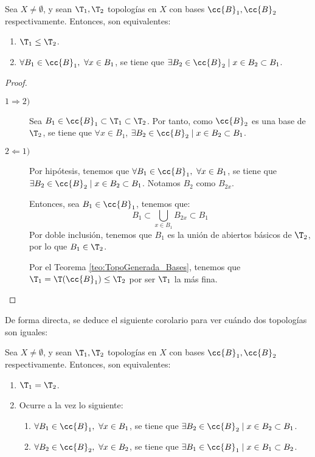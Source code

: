 \begin{prop}
    Sea $X\neq \emptyset$, y sean $\T_1, \T_2$ topologías en $X$ con bases $\cc{B}_1, \cc{B}_2$ respectivamente. Entonces, son equivalentes:
    \begin{enumerate}
        \item $\T_1\leq \T_2$.
        \item $\forall B_1\in \cc{B}_1,~\forall x\in B_1$, se tiene que $\exists B_2\in \cc{B}_2\mid x\in B_2\subset B_1$.
    \end{enumerate}
\end{prop}
\begin{proof}\
    \begin{description}
        \item[$1\Longrightarrow 2)$] Sea $B_1\in \cc{B}_1\subset \T_1\subset \T_2$. Por tanto, como $\cc{B}_2$ es una base de $\T_2$, se tiene que $\forall x\in B_1$, $\exists B_2\in \cc{B}_2\mid x\in B_2\subset B_1$.

        \item[$2\Longleftarrow 1)$] Por hipótesis, tenemos que
        $\forall B_1\in \cc{B}_1,~\forall x\in B_1$, se tiene que $\exists B_2\in \cc{B}_2\mid x\in B_2\subset B_1$. Notamos $B_2$ como $B_{2x}$.
        
        Entonces, sea $B_1\in \cc{B}_1$, tenemos que:
        $$B_1\subset \bigcup_{x\in B_1}B_{2x}\subset B_1$$
        Por doble inclusión, tenemos que $B_1$ es la unión de abiertos básicos de $\T_2$, por lo que $B_1\in \T_2$.
        
        Por el Teorema \ref{teo:TopoGenerada_Bases}, tenemos que $\T_1=\T(\cc{B}_1)\leq \T_2$ por ser $\T_1$ la más fina.
    \end{description}
\end{proof}

De forma directa, se deduce el siguiente corolario para ver cuándo dos topologías son iguales:
\begin{coro}\label{coro:TopIg_Bases}
    Sea $X\neq \emptyset$, y sean $\T_1, \T_2$ topologías en $X$ con bases $\cc{B}_1, \cc{B}_2$ respectivamente. Entonces, son equivalentes:
    \begin{enumerate}
        \item $\T_1 = \T_2$.
        \item Ocurre a la vez lo siguiente:
        \begin{enumerate}
            \item $\forall B_1\in \cc{B}_1,~\forall x\in B_1$, se tiene que $\exists B_2\in \cc{B}_2\mid x\in B_2\subset B_1$.
            \item $\forall B_2\in \cc{B}_2,~\forall x\in B_2$, se tiene que $\exists B_1\in \cc{B}_1\mid x\in B_1\subset B_2$.
        \end{enumerate}
    \end{enumerate}
\end{coro}


